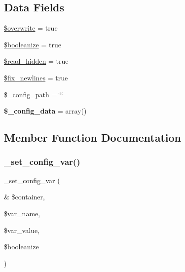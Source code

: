 \subsection*{Data Fields}
\begin{DoxyCompactItemize}
\item 
\mbox{\hyperlink{class_config___file_a8d31b0ad9cccde7e2d857097672ed6cf}{\$overwrite}} = true
\item 
\mbox{\hyperlink{class_config___file_af0cf19013c4ba6a4be61cd12d4d58176}{\$booleanize}} = true
\item 
\mbox{\hyperlink{class_config___file_adc9cc2cebe0db470e85719ea48d9b40e}{\$read\+\_\+hidden}} = true
\item 
\mbox{\hyperlink{class_config___file_a2acc1a2a1a6e166957d9b731ff8afaa5}{\$fix\+\_\+newlines}} = true
\item 
\mbox{\hyperlink{class_config___file_a215112f5a6d6e46a3478f83b8108ca96}{\$\+\_\+config\+\_\+path}} = \char`\"{}\char`\"{}
\item 
\mbox{\label{class_config___file_a4a14d39558fa2bcea2f8221bf8e123ef}} 
{\bfseries \$\+\_\+config\+\_\+data} = array()
\end{DoxyCompactItemize}


\subsection{Member Function Documentation}
\mbox{\label{class_config___file_a395dfc55bb2ce7e6126e453e7d7c3c59}} 
\subsubsection{\texorpdfstring{\+\_\+set\+\_\+config\+\_\+var()}{\_set\_config\_var()}}
{\footnotesize\ttfamily \+\_\+set\+\_\+config\+\_\+var (\begin{DoxyParamCaption}\item[{\&}]{\$container,  }\item[{}]{\$var\+\_\+name,  }\item[{}]{\$var\+\_\+value,  }\item[{}]{\$booleanize }\end{DoxyParamCaption})}

